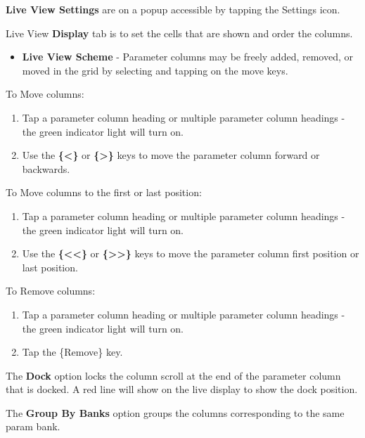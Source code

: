 \documentclass[
]{article}
\providecommand{\tightlist}{%
  \setlength{\itemsep}{0pt}\setlength{\parskip}{0pt}}
\begin{document}
\textbf{Live View Settings} are on a popup accessible by tapping the Settings icon.

Live View \textbf{Display} tab is to set the cells that are shown and order the columns.

\begin{itemize}
\tightlist
\item
  \textbf{Live View Scheme} - Parameter columns may be freely added, removed, or moved in the grid by selecting and tapping on the move keys.
\end{itemize}

To Move columns:

\begin{enumerate}
\def\labelenumi{\arabic{enumi}.}
\item
  Tap a parameter column heading or multiple parameter column headings - the green indicator light will turn on.
\item
  Use the \textbf{\{\textbar\textless\}} or \textbf{\{\textgreater\textbar\}} keys to move the parameter column forward or backwards.
\end{enumerate}

To Move columns to the first or last position:

\begin{enumerate}
\def\labelenumi{\arabic{enumi}.}
\item
  Tap a parameter column heading or multiple parameter column headings - the green indicator light will turn on.
\item
  Use the \textbf{\{\textbar\textless\textless\}} or \textbf{\{\textgreater\textgreater\textbar\}} keys to move the parameter column first position or last position.
\end{enumerate}

To Remove columns:

\begin{enumerate}
\def\labelenumi{\arabic{enumi}.}
\item
  Tap a parameter column heading or multiple parameter column headings - the green indicator light will turn on.
\item
  Tap the \{Remove\} key.
\end{enumerate}

The \textbf{Dock} option locks the column scroll at the end of the parameter column that is docked. A red line will show on the live display to show the dock position.

The \textbf{Group By Banks} option groups the columns corresponding to the same param bank.
\end{document}
